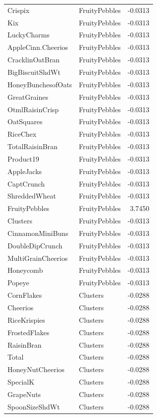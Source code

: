 \begin{longtable}{llr}
Crispix & FruityPebbles & -0.0313 \\
Kix & FruityPebbles & -0.0313 \\
LuckyCharms & FruityPebbles & -0.0313 \\
AppleCinn.Cheerios & FruityPebbles & -0.0313 \\
CracklinOatBran & FruityPebbles & -0.0313 \\
BigBiscuitShdWt & FruityPebbles & -0.0313 \\
HoneyBunchesofOats & FruityPebbles & -0.0313 \\
GreatGraines & FruityPebbles & -0.0313 \\
OtmlRaisinCrisp & FruityPebbles & -0.0313 \\
OatSquares & FruityPebbles & -0.0313 \\
RiceChex & FruityPebbles & -0.0313 \\
TotalRaisinBran & FruityPebbles & -0.0313 \\
Product19 & FruityPebbles & -0.0313 \\
AppleJacks & FruityPebbles & -0.0313 \\
CaptCrunch & FruityPebbles & -0.0313 \\
ShreddedWheat & FruityPebbles & -0.0313 \\
FruityPebbles & FruityPebbles & 3.7450 \\
Clusters & FruityPebbles & -0.0313 \\
CinnamonMiniBuns & FruityPebbles & -0.0313 \\
DoubleDipCrunch & FruityPebbles & -0.0313 \\
MultiGrainCheerios & FruityPebbles & -0.0313 \\
Honeycomb & FruityPebbles & -0.0313 \\
Popeye & FruityPebbles & -0.0313 \\
CornFlakes & Clusters & -0.0288 \\
Cheerios & Clusters & -0.0288 \\
RiceKrispies & Clusters & -0.0288 \\
FrostedFlakes & Clusters & -0.0288 \\
RaisinBran & Clusters & -0.0288 \\
Total & Clusters & -0.0288 \\
HoneyNutCheerios & Clusters & -0.0288 \\
SpecialK & Clusters & -0.0288 \\
GrapeNuts & Clusters & -0.0288 \\
SpoonSizeShdWt & Clusters & -0.0288 \\

\end{longtable}
